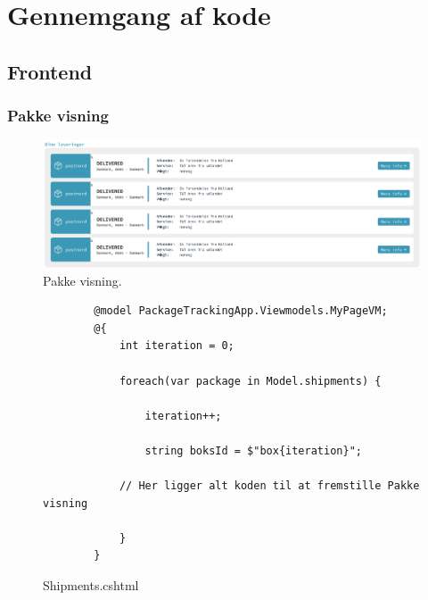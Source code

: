 \chapter{Gennemgang af kode}
\section{Frontend}
\subsection{Pakke visning}

\begin{figure}[h]
    \includegraphics[scale=0.35]{./Pictures/PakkeView.png}
    \centering
    \caption{Pakke visning.}
     \label{fig:PakkeView}
  \end{figure}

\begin{figure}[!h]
    \begin{verbatim}
        @model PackageTrackingApp.Viewmodels.MyPageVM;
        @{
            int iteration = 0;

            foreach(var package in Model.shipments) {

                iteration++;

                string boksId = $"box{iteration}";
             
            // Her ligger alt koden til at fremstille Pakke visning
                
            }
        }
    \end{verbatim}
\caption{Shipments.cshtml}

\label{code:Shipments.cs}
\end{figure}

